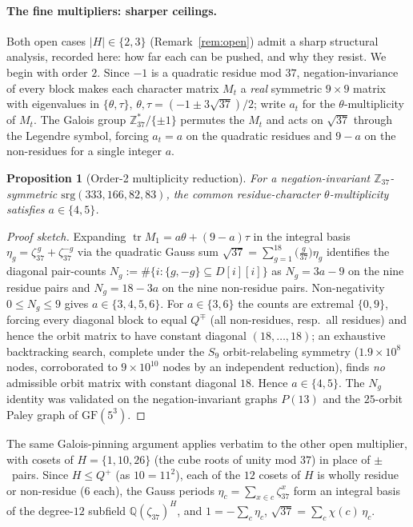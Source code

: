 \documentclass[11pt]{article}
\newtheorem{proposition}{Proposition}
\theoremstyle{definition}
\newcommand{\Z}{\mathbb{Z}}
\newcommand{\Q}{\mathbb{Q}}
\begin{document}
\paragraph{The fine multipliers: sharper ceilings.} Both open cases $|H|\in\{2,3\}$
(Remark~\ref{rem:open}) admit a sharp structural analysis, recorded here: how far each can be pushed, and
why they resist. We begin with order $2$. Since $-1$ is a quadratic residue mod $37$, negation-invariance of every block makes each
character matrix $M_t$ a \emph{real} symmetric $9\times9$ matrix with eigenvalues in $\{\theta,\tau\}$,
$\theta,\tau=(-1\pm3\sqrt{37})/2$; write $a_t$ for the $\theta$-multiplicity of $M_t$. The Galois group
$\Z_{37}^\ast/\{\pm1\}$ permutes the $M_t$ and acts on $\sqrt{37}$ through the Legendre symbol, forcing
$a_t=a$ on the quadratic residues and $9-a$ on the non-residues for a single integer $a$.

\begin{proposition}[Order-2 multiplicity reduction]\label{prop:order2}
For a negation-invariant $\Z_{37}$-symmetric $\mathrm{srg}(333,166,82,83)$, the common residue-character
$\theta$-multiplicity satisfies $a\in\{4,5\}$.
\end{proposition}
\begin{proof}[Proof sketch]
Expanding $\operatorname{tr}M_1=a\theta+(9-a)\tau$ in the integral basis $\eta_g=\zeta_{37}^{\,g}
+\zeta_{37}^{-g}$ via the quadratic Gauss sum $\sqrt{37}=\sum_{g=1}^{18}\bigl(\tfrac{g}{37}\bigr)\eta_g$
identifies the diagonal pair-counts $N_g:=\#\{i:\{g,-g\}\subseteq D[i][i]\}$ as $N_g=3a-9$ on the nine
residue pairs and $N_g=18-3a$ on the nine non-residue pairs. Non-negativity $0\le N_g\le 9$ gives
$a\in\{3,4,5,6\}$. For $a\in\{3,6\}$ the counts are extremal $\{0,9\}$, forcing every diagonal block to
equal $Q^{\mp}$ (all non-residues, resp.\ all residues) and hence the orbit matrix to have constant
diagonal $(18,\dots,18)$; an exhaustive backtracking search, complete under the $S_9$ orbit-relabeling
symmetry ($1.9\times10^{8}$ nodes, corroborated to $9\times10^{10}$ nodes by an independent reduction),
finds \emph{no} admissible orbit matrix with constant diagonal $18$. Hence $a\in\{4,5\}$. The $N_g$ identity
was validated on the negation-invariant graphs $P(13)$ and the $25$-orbit Paley graph of $\mathrm{GF}(5^3)$.
\end{proof}

The same Galois-pinning argument applies verbatim to the other open multiplier, with cosets of
$H=\{1,10,26\}$ (the cube roots of unity mod $37$) in place of $\pm$~pairs. Since $H\le Q^{+}$
(as $10=11^2$), each of the $12$ cosets of $H$ is wholly residue or non-residue ($6$ each), the Gauss
periods $\eta_c=\sum_{x\in c}\zeta_{37}^x$ form an integral basis of the degree-$12$ subfield
$\Q(\zeta_{37})^H$, and $1=-\sum_c\eta_c$, $\sqrt{37}=\sum_c\chi(c)\,\eta_c$.
\end{document}
